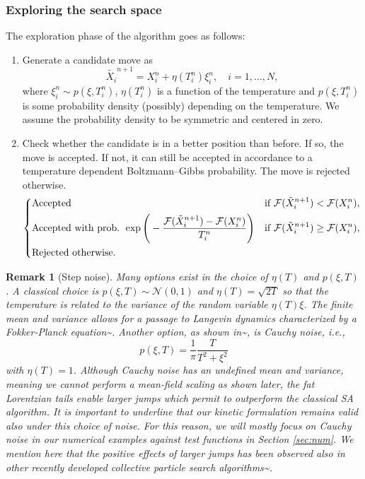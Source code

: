 \documentclass[10pt,a4paper]{article}
\theoremstyle{theorem}
\newtheorem{remark}{Remark}[section]
\numberwithin{equation}{section}
\begin{document}
\subsubsection{Exploring the search space}
\label{subsec:particle_Lf}
The exploration phase of the algorithm goes as follows:
\begin{enumerate}
\item Generate a candidate move as
\begin{equation}
\label{eq:SAcandidate}
\tilde{X_i}^{n+1}=X_i^n+\eta(T_i^n)\xi_i^n,\quad i=1,\ldots,N,
\end{equation}
where $\xi_i^n\sim p(\xi, T^n_i)$, $\eta(T_i^n)$ is a function of the temperature and $p(\xi, T^n_i)$ is some probability density (possibly) depending on the temperature. We assume the probability density to be symmetric and centered in zero.
\item Check whether the candidate is in a better position than before. If so, the move is accepted. If not, it can still be accepted in accordance to a temperature dependent Boltzmann--Gibbs probability. The move is rejected otherwise.
\begin{equation}
\label{eq:SAacceptreject}
\begin{dcases}
\text{Accepted}& \text{if }\mathcal{F}(\tilde{X}_i^{n+1})<\mathcal{F}(X_i^n),\\
\text{Accepted with prob. } \exp\Bigg(-\frac{\mathcal{F}(\tilde{X}_i^{n+1})-\mathcal{F}(X_i^n)}{T_i^n}\Bigg)& \text{if }\mathcal{F}(\tilde{X}_i^{n+1})\geq\mathcal{F}(X_i^n),\\
\text{Rejected otherwise.}
\end{dcases}
\end{equation}
\end{enumerate}

\begin{remark}[Step noise]
\label{rem:noise}
Many options exist in the choice of $\eta(T)$ and $p(\xi, T)$. A classical choice is $p(\xi,T)\sim\mathcal{N}(0,1)$ and $\eta(T)=\sqrt{2T}$ so that the temperature is related to the variance of the random variable $\eta(T)\xi$. The finite mean and variance allows for a passage to Langevin dynamics characterized by a Fokker-Planck equation^^>\cite{pareschi_optimization_2024, chizat_mean-field_2022}.
Another option, as shown in^^>\cite{szu_fast_1987, xavier-de-souza_coupled_2010}, is Cauchy noise, i.e., \[p(\xi, T)=\frac{1}{\pi}\frac{T}{T^2+\xi^2}\] with $\eta(T)=1$. Although Cauchy noise has an undefined mean and variance, meaning we cannot perform a mean-field scaling as shown later, the fat Lorentzian tails enable larger jumps which permit to outperform the classical SA algorithm. It is important to underline that our kinetic formulation remains valid also under this choice of noise. For this reason, we will mostly focus on Cauchy noise in our numerical examples against test functions in Section \ref{sec:num}. We mention here that the positive effects of larger jumps has been observed also in other recently developed collective particle search algorithms^^>\cite{kalise_consensus-based_2023,borghi_swarm-based_2025}.
\end{remark}
\end{document}
